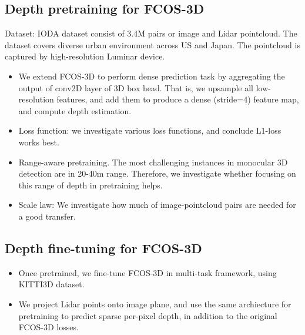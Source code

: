 \subsection{Depth pretraining for FCOS-3D}
Dataset: IODA dataset consist of 3.4M pairs or image and Lidar pointcloud. The dataset covers diverse urban environment across US and Japan. The pointcloud is captured by high-resolution Luminar device.
\begin{itemize}
    \item We extend FCOS-3D to perform dense prediction task by aggregating the output of conv2D layer of 3D box head. That is, we upsample all low-resolution features, and add them to produce a dense (stride=4) feature map, and compute depth estimation.
    \item Loss function: we investigate various loss functions, and conclude L1-loss works best. 
    \item Range-aware pretraining. The most challenging instances in monocular 3D detection are in 20-40m range. Therefore, we investigate whether focusing on this range of depth in pretraining helps.
    \item Scale law: We investigate how much of image-pointcloud pairs are needed for a good transfer.
\end{itemize}
\subsection{Depth fine-tuning for FCOS-3D}
\begin{itemize}
    \item Once pretrained, we fine-tune FCOS-3D in multi-task framework, using KITTI3D dataset.
    \item We project Lidar points onto image plane, and use the same archiecture for pretraining to predict sparse per-pixel depth, in addition to the original FCOS-3D losses.
\end{itemize}